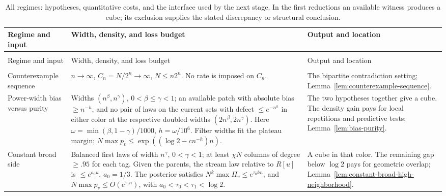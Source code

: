 \begingroup
\small
\setlength{\tabcolsep}{4pt}
\renewcommand{\arraystretch}{1.18}
\begin{longtable}{@{}>{\raggedright\arraybackslash}p{.255\linewidth}>{\raggedright\arraybackslash}p{.355\linewidth}>{\raggedright\arraybackslash}p{.345\linewidth}@{}}
\caption{All regimes: hypotheses, quantitative costs, and the interface
used by the next stage. In the first reductions an available witness
produces a cube; its exclusion supplies the stated discrepancy or
structural conclusion.}\label{tab:all-regimes}\\
\toprule
Regime and input & Width, density, and loss budget & Output and location\\
\midrule
\endfirsthead
\multicolumn{3}{l}{\textit{Table~\thetable\ continued}}\\
\toprule
Regime and input & Width, density, and loss budget & Output and location\\
\midrule
\endhead
\midrule
\multicolumn{3}{r}{\textit{Continued on the next page}}\\
\endfoot
\bottomrule
\endlastfoot

Counterexample sequence &
$n\to\infty$, $C_n=N/2^n\to\infty$, $N\le n2^n$. No rate is imposed
on $C_n$. &
The bipartite contradiction setting;
Lemma~\ref{lem:counterexample-sequence}.\\

Power-width bias versus purity &
Widths $(n^\beta,n^\gamma)$, $0<\beta\le\gamma<1$; an available
patch with absolute bias $\ge n^{-h}$, and no pair of laws on the
current sets with defect $\le e^{-n^h}$ in either color at the
respective doubled widths $(2n^\beta,2n^\gamma)$.
Here $\omega=\min(\beta,1-\gamma)/1000$, $h=\omega/10^6$.
Filter widths fit the plateau margin;
$N\max p_v\le\exp((\log2-c n^{-h})n)$. &
The two hypotheses together give a cube. The density gain pays for local
repetitions and predictive tests;
Lemma~\ref{lem:bias-purity}.\\

Constant broad side &
Balanced first laws of width $n^\gamma$, $0<\gamma<1$; at least $\chi N$
columns of degree $\ge.95$ for each tag. Given the parents, the stream
law relative to $R[u]$ is $\le e^{a_0u}$, $a_0=1/3$.
The posterior satisfies $N^k\max\Pi_v\le e^{\tau_0kn}$, and
$N\max p_v\le O(e^{\tau_1n})$, with
$a_0<\tau_0<\tau_1<\log2$. &
A cube in that color. The remaining gap below $\log2$ pays for geometric
overlap; Lemma~\ref{lem:constant-broad-high-neighborhood}.\\


\end{longtable}
